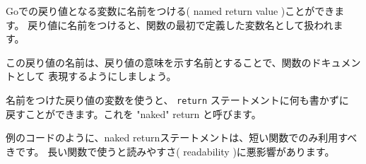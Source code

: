 Goでの戻り値となる変数に名前をつける( named return value )ことができます。
戻り値に名前をつけると、関数の最初で定義した変数名として扱われます。

この戻り値の名前は、戻り値の意味を示す名前とすることで、関数のドキュメントとして
表現するようにしましょう。

名前をつけた戻り値の変数を使うと、 \texttt{return} ステートメントに何も書かずに
戻すことができます。これを "naked" return と呼びます。

例のコードのように、naked returnステートメントは、短い関数でのみ利用すべきです。
長い関数で使うと読みやすさ( readability )に悪影響があります。